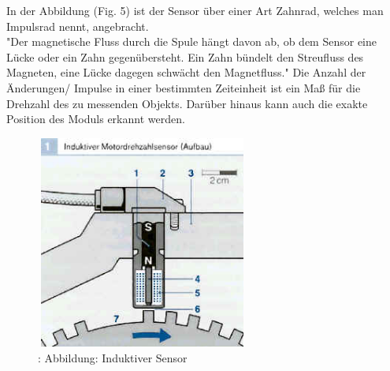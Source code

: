 			
				\begin{flushleft}
					In der Abbildung (Fig. 5) ist der Sensor über einer Art Zahnrad, welches man Impulsrad nennt, angebracht.\\
					"Der magnetische Fluss durch die Spule hängt davon ab, ob dem Sensor eine Lücke oder ein Zahn gegenübersteht. Ein Zahn bündelt den Streufluss des Magneten, eine Lücke dagegen schwächt den Magnetfluss." \cite{TS08}  
					Die Anzahl der Änderungen/ Impulse in einer bestimmten Zeiteinheit ist ein Maß für die Drehzahl des zu messenden Objekts. Darüber hinaus kann auch die exakte Position des Moduls erkannt werden.\\						
				\end{flushleft}
			
				\begin{figure}
					\centering
					\includegraphics[width=7cm, height=7cm] {aufbau_induktiv.png}
					\caption{\cite{TS09}: Abbildung: Induktiver Sensor}
				\end{figure}
				
